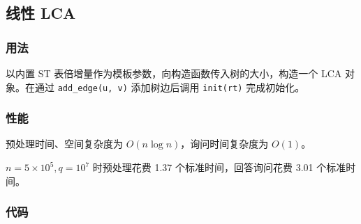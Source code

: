 \subsection{线性 LCA}

\subsubsection{用法}

以内置 ST 表倍增量作为模板参数，向构造函数传入树的大小，构造一个 LCA 对象。在通过 \lstinline{add_edge(u, v)} 添加树边后调用 \lstinline{init(rt)} 完成初始化。

\subsubsection{性能}

预处理时间、空间复杂度为 $O(n \log n)$，询问时间复杂度为 $O(1)$。

$n = 5 \times 10^5, q = 10^7$ 时预处理花费 1.37 个标准时间，回答询问花费 3.01 个标准时间。

\subsubsection{代码}


